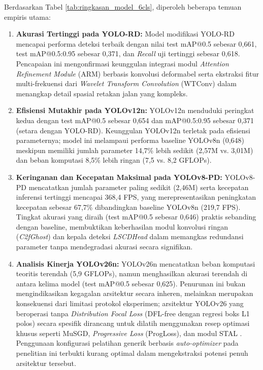 Berdasarkan Tabel \ref{tab:ringkasan_model_6cls}, diperoleh beberapa temuan empiris utama:
\begin{enumerate}
	\item \textbf{Akurasi Tertinggi pada YOLO-RD:} Model modifikasi YOLO-RD mencapai performa deteksi terbaik dengan nilai test mAP@0.5 sebesar 0,661, test mAP@0.5:0.95 sebesar 0,371, dan \textit{Recall} uji tertinggi sebesar 0,618. Pencapaian ini mengonfirmasi keunggulan integrasi modul \textit{Attention Refinement Module} (ARM) berbasis konvolusi deformabel serta ekstraksi fitur multi-frekuensi dari \textit{Wavelet Transform Convolution} (WTConv) dalam menangkap detail spasial retakan jalan yang kompleks.
	\item \textbf{Efisiensi Mutakhir pada YOLOv12n:} YOLOv12n menduduki peringkat kedua dengan test mAP@0.5 sebesar 0,654 dan mAP@0.5:0.95 sebesar 0,371 (setara dengan YOLO-RD). Keunggulan YOLOv12n terletak pada efisiensi parameternya; model ini melampaui performa baseline YOLOv8n (0,648) meskipun memiliki jumlah parameter 14,7\% lebih sedikit (2,57M vs. 3,01M) dan beban komputasi 8,5\% lebih ringan (7,5 vs. 8,2 GFLOPs).
	\item \textbf{Keringanan dan Kecepatan Maksimal pada YOLOv8-PD:} YOLOv8-PD mencatatkan jumlah parameter paling sedikit (2,46M) serta kecepatan inferensi tertinggi mencapai 368,4 FPS, yang merepresentasikan peningkatan kecepatan sebesar 67,7\% dibandingkan baseline YOLOv8n (219,7 FPS). Tingkat akurasi yang diraih (test mAP@0.5 sebesar 0,646) praktis sebanding dengan baseline, membuktikan keberhasilan modul konvolusi ringan (\textit{C2fGhost}) dan kepala deteksi \textit{LSCDHead} dalam memangkas redundansi parameter tanpa mendegradasi akurasi secara signifikan.
	\item \textbf{Analisis Kinerja YOLOv26n:} YOLOv26n mencatatkan beban komputasi teoritis terendah (5,9 GFLOPs), namun menghasilkan akurasi terendah di antara kelima model (test mAP@0.5 sebesar 0,625). Penurunan ini bukan mengindikasikan kegagalan arsitektur secara inheren, melainkan merupakan konsekuensi dari limitasi protokol eksperimen; arsitektur YOLOv26 yang beroperasi tanpa \textit{Distribution Focal Loss} (DFL-free dengan regresi boks L1 polos) secara spesifik dirancang untuk dilatih menggunakan resep optimasi khusus seperti MuSGD, \textit{Progressive Loss} (ProgLoss), dan modul STAL \cite{sapkota2025yolo26}. Penggunaan konfigurasi pelatihan generik berbasis \textit{auto-optimizer} pada penelitian ini terbukti kurang optimal dalam mengekstraksi potensi penuh arsitektur tersebut.
\end{enumerate}

